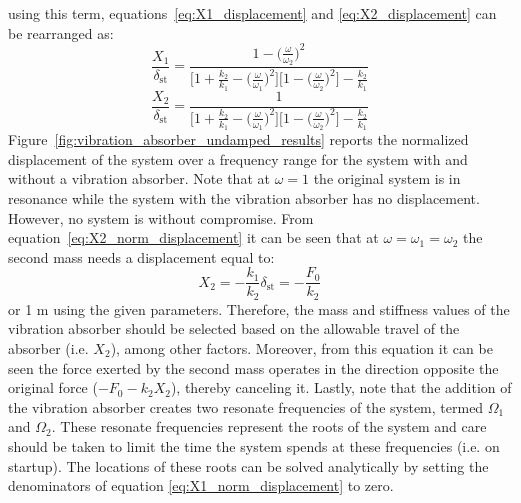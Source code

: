 \documentclass[12pt,letter]{article}
\begin{document}
using this term, equations~\ref{eq:X1_displacement} and \ref{eq:X2_displacement} can be rearranged as:
\begin{equation}
\frac{X_1}{\delta_{\text{st}}} = \frac{1 - \big(\frac{\omega}{\omega_2} \big)^2 }{\Big[1 + \frac{k_2}{k_1} - \big(\frac{\omega}{\omega_1} \big)^2 \Big] \Big[ 1- \big(\frac{\omega}{\omega_2} \big)^2 \Big] -\frac{k_2}{k_1}}
\label{eq:X1_norm_displacement}
\end{equation}
\begin{equation}
\frac{X_2}{\delta_{\text{st}}} = \frac{1}{\Big[1 + \frac{k_2}{k_1} - \big(\frac{\omega}{\omega_1} \big)^2 \Big] \Big[ 1- \big(\frac{\omega}{\omega_2} \big)^2 \Big] -\frac{k_2}{k_1}}
\label{eq:X2_norm_displacement}
\end{equation}
Figure~\ref{fig:vibration_absorber_undamped_results} reports the normalized displacement of the system over a frequency range for the system with and without a vibration absorber. Note that at $\omega=1$ the original system is in resonance while the system with the vibration absorber has no displacement. However, no system is without compromise. From equation~\ref{eq:X2_norm_displacement} it can be seen that at $\omega = \omega_1 = \omega_2$ the second mass needs a displacement equal to:
\begin{equation}
X_2 = -\frac{k_1}{k_2}\delta_{\text{st}} = -\frac{F_0}{k_2}
\end{equation}
or 1 m using the given parameters. Therefore, the mass and stiffness values of the vibration absorber should be selected based on the allowable travel of the absorber (i.e. $X_2$), among other factors. Moreover, from this equation it can be seen the force exerted by the second mass operates in the direction opposite the original force ($-F_0 - k_2 X_2$), thereby canceling it. Lastly, note that the addition of the vibration absorber creates two resonate frequencies of the system, termed $\Omega_1$ and $\Omega_2$. These resonate frequencies represent the roots of the system and care should be taken to limit the time the system spends at these frequencies (i.e. on startup). The locations of these roots can be solved analytically by setting the denominators of equation \ref{eq:X1_norm_displacement} to zero.

\end{document}

